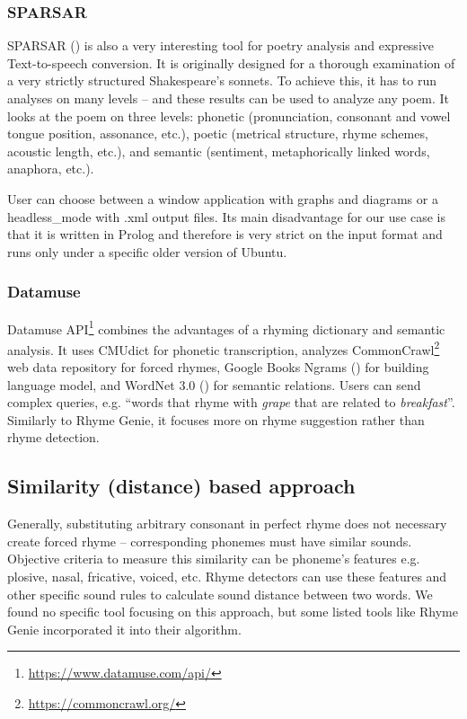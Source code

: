 \subsubsection*{SPARSAR}
SPARSAR (\cite{Delmonte2014}) is also a very interesting tool for poetry analysis and expressive Text-to-speech conversion. It is originally designed for a thorough examination of a very strictly structured Shakespeare's sonnets. To achieve this, it has to run analyses on many levels -- and these results can be used to analyze any poem. It looks at the poem on three levels: phonetic (pronunciation, consonant and vowel tongue position, assonance, etc.), poetic (metrical structure, rhyme schemes, acoustic length, etc.), and semantic (sentiment, metaphorically linked words, anaphora, etc.).

User can choose between a window application with graphs and diagrams or a \gls{headless_mode} with .xml output files. Its main disadvantage for our use case is that it is written in Prolog and therefore is very strict on the input format and runs only under a specific older version of Ubuntu. 

\subsubsection*{Datamuse}
Datamuse API\footnote{\url{https://www.datamuse.com/api/}} combines the advantages of a rhyming dictionary and semantic analysis. It uses CMUdict for phonetic transcription, analyzes CommonCrawl\footnote{\url{https://commoncrawl.org/}} web data repository for forced rhymes, Google Books Ngrams (\cite{weiss2015google}) for building language model, and WordNet 3.0 (\cite{pearson2005encyclopedia}) for semantic relations. Users can send complex queries, e.g. ``words that rhyme with \textit{grape} that are related to \textit{breakfast}''. Similarly to Rhyme Genie, it focuses more on rhyme suggestion rather than rhyme detection.


\subsection{Similarity (distance) based approach}
Generally, substituting arbitrary consonant in perfect rhyme does not necessary create forced rhyme -- corresponding phonemes must have similar sounds. Objective criteria to measure this similarity can be phoneme's features e.g. plosive, nasal, fricative, voiced, etc. Rhyme detectors can use these features and other specific sound rules to calculate sound distance between two words. We found no specific tool focusing on this approach, but some listed tools like Rhyme Genie incorporated it into their algorithm. 

